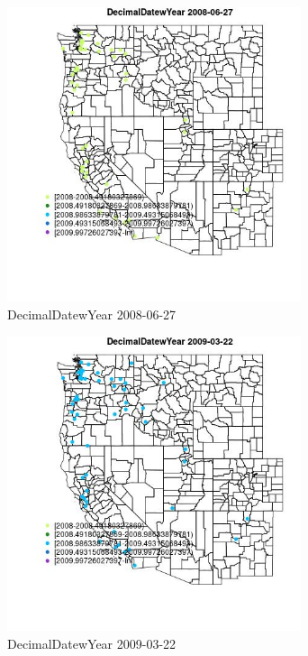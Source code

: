 \begin{figure} 
\centering  
\includegraphics[width=0.77\textwidth]{Code_Outputs/Report_ML_input_PM25_Step4_part_e_de_duplicated_aves_MapObsDecimalDatewYear2008-06-27.jpg} 
\caption{\label{fig:Report_ML_input_PM25_Step4_part_e_de_duplicated_avesMapObsDecimalDatewYear2008-06-27}DecimalDatewYear 2008-06-27} 
\end{figure} 
 

\begin{figure} 
\centering  
\includegraphics[width=0.77\textwidth]{Code_Outputs/Report_ML_input_PM25_Step4_part_e_de_duplicated_aves_MapObsDecimalDatewYear2009-03-22.jpg} 
\caption{\label{fig:Report_ML_input_PM25_Step4_part_e_de_duplicated_avesMapObsDecimalDatewYear2009-03-22}DecimalDatewYear 2009-03-22} 
\end{figure} 
 

